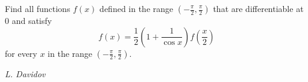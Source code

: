 Find all functions $f(x)$ defined in the range $\left(-\frac\pi2,\frac\pi2\right)$ that are differentiable at $0$ and satisfy
$$f(x)=\frac12\left(1+\frac1{\cos x}\right)f\left(\frac x2\right)$$for every $x$ in the range $\left(-\frac\pi2,\frac\pi2\right)$.

\textit{L. Davidov}